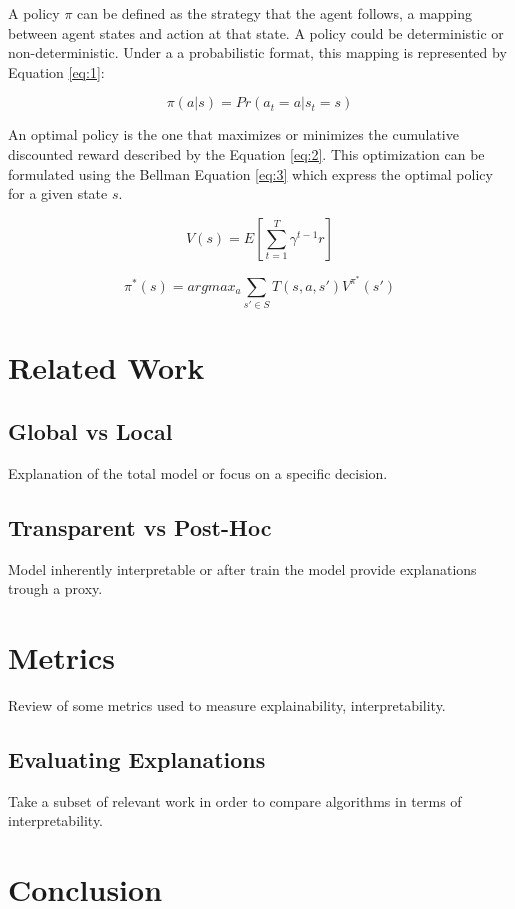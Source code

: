 \documentclass[runningheads]{llncs}
\begin{document}
A policy $\pi$ can be defined as the strategy that the agent follows, a mapping between agent states and action at that state. A policy could be deterministic or non-deterministic. Under a a probabilistic format, this mapping is represented by Equation \ref{eq:1}:

\begin{equation}
\label{eq:1}
\pi(a|s) = Pr(a_t=a|s_t=s)    
\end{equation}


An optimal policy is the one that maximizes or minimizes the cumulative discounted reward described by the Equation \ref{eq:2}. This optimization can be formulated using the Bellman Equation \ref{eq:3} which express the optimal policy for a given state $s$.

\begin{equation}
\label{eq:2}
    V(s)=E[\sum_{t=1}^{T}\gamma^{t-1}r]
\end{equation}

\begin{equation}
\label{eq:3}
    \pi^*(s)=argmax_a \sum_{s' \in S}T(s,a,s')V^{\pi ^*}(s')
\end{equation}


\section{Related Work}



\subsection{Global vs Local }
Explanation of the total model or focus on a specific decision.

\subsection{Transparent vs Post-Hoc }
Model inherently interpretable or after train the model provide explanations trough a proxy.

\section{Metrics}
Review of some metrics used to measure explainability, interpretability.

\subsection{Evaluating Explanations}
Take a subset of relevant work in order to compare algorithms in terms of interpretability.

\section{Conclusion}

%
%
%


%
\end{document}
